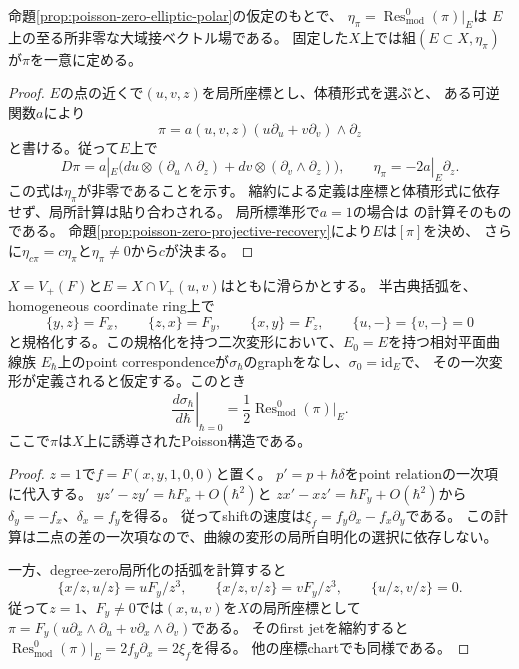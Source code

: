 \begin{proposition}
\label{prop:poisson-modular-scale-recovery}
命題\ref{prop:poisson-zero-elliptic-polar}の仮定のもとで、
$\eta_\pi=\operatorname{Res}^{0}_{\mathrm{mod}}(\pi)|_E$は
$E$上の至る所非零な大域接ベクトル場である。
固定した$X$上では組$(E\subset X,\eta_\pi)$が$\pi$を一意に定める。
\end{proposition}

\begin{proof}
$E$の点の近くで$(u,v,z)$を局所座標とし、体積形式を選ぶと、
ある可逆関数$a$により
\[
 \pi=a(u,v,z)(u\partial_u+v\partial_v)\wedge\partial_z
\]
と書ける。従って$E$上で
\[
 D\pi=a|_E\bigl(du\otimes(\partial_u\wedge\partial_z)
                  +dv\otimes(\partial_v\wedge\partial_z)\bigr),
 \qquad \eta_\pi=-2a|_E\partial_z.
\]
この式は$\eta_\pi$が非零であることを示す。
縮約による定義は座標と体積形式に依存せず、局所計算は貼り合わされる。
局所標準形で$a=1$の場合は
\cite[Example~7.4]{GualtieriPym}の計算そのものである。
命題\ref{prop:poisson-zero-projective-recovery}により$E$は$[\pi]$を決め、
さらに$\eta_{c\pi}=c\eta_\pi$と$\eta_\pi\ne0$から$c$が決まる。
\end{proof}

\begin{proposition}[Jacobian模型の一般の速度比較]
\label{prop:jacobian-modular-shift-comparison}
$X=V_+(F)$と$E=X\cap V_+(u,v)$はともに滑らかとする。
半古典括弧を、homogeneous coordinate ring上で
\[
 \{y,z\}=F_x,\qquad \{z,x\}=F_y,\qquad \{x,y\}=F_z,
 \qquad \{u,-\}=\{v,-\}=0
\]
と規格化する。この規格化を持つ二次変形において、$E_0=E$を持つ相対平面曲線族
$E_\hbar$上のpoint correspondenceが$\sigma_\hbar$のgraphをなし、$\sigma_0=\mathrm{id}_E$で、
その一次変形が定義されると仮定する。このとき
\[
 \left.\frac{d\sigma_\hbar}{d\hbar}\right|_{\hbar=0}
 =\frac12\operatorname{Res}^0_{\mathrm{mod}}(\pi)|_E.
\]
ここで$\pi$は$X$上に誘導されたPoisson構造である。
\end{proposition}

\begin{proof}
$z=1$で$f=F(x,y,1,0,0)$と置く。
$p'=p+\hbar\delta$をpoint relationの一次項に代入する。
$yz'-zy'=\hbar F_x+O(\hbar^2)$と
$zx'-xz'=\hbar F_y+O(\hbar^2)$から
$\delta_y=-f_x$、$\delta_x=f_y$を得る。
従ってshiftの速度は$\xi_f=f_y\partial_x-f_x\partial_y$である。
この計算は二点の差の一次項なので、曲線の変形の局所自明化の選択に依存しない。

一方、degree-zero局所化の括弧を計算すると
\[
 \{x/z,u/z\}=uF_y/z^3,\qquad
 \{x/z,v/z\}=vF_y/z^3,\qquad
 \{u/z,v/z\}=0.
\]
従って$z=1$、$F_y\ne0$では$(x,u,v)$を$X$の局所座標として
$\pi=F_y(u\partial_x\wedge\partial_u+v\partial_x\wedge\partial_v)$である。
そのfirst jetを縮約すると
$\operatorname{Res}^0_{\mathrm{mod}}(\pi)|_E=2f_y\partial_x=2\xi_f$を得る。
他の座標chartでも同様である。
\end{proof}


